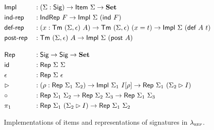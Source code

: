 \begin{figure}[H]
  \begin{alignat*}{2}
  & \Impl &&: (\Sigma : \Sig) \to \Item\ \Sigma \to \Set \\
  & \mta{ind-rep} &&: \mta{IndRep}\ F \to \Impl\ \Sigma\ (\mta{ind}\ F) \\
  & \mta{def-rep} &&: (x : \Tm\ (\Sigma, \epsilon)\ A) \to \Tm\ (\Sigma, \epsilon)\ (x = t) \to \Impl\ \Sigma\ (\mta{def}\ A\ t) \\
  & \mta{post-rep} &&: \Tm\ (\Sigma, \epsilon)\ A \to \Impl\ \Sigma\ (\mta{post}\ A) \\[1em]
  & \Rep &&: \Sig \to \Sig \to \Set \\
  & \mta{id} &&: \Rep\ \Sigma\ \Sigma \\
  & \epsilon &&: \Rep\ \Sigma\ \epsilon \\
  & \rhd &&: (\rho : \Rep\ \Sigma_1\ \Sigma_2) \to \Impl\ \Sigma_1\ I[\rho] \to \Rep\ \Sigma_1\ (\Sigma_2\rhd I) \\
  & \circ &&: \Rep\ \Sigma_1\ \Sigma_2 \to \Rep\ \Sigma_2\ \Sigma_3 \to \Rep\ \Sigma_1\ \Sigma_3 \\
  & \pi_1 &&: \Rep\ \Sigma_1\ (\Sigma_2 \rhd I) \to \Rep\ \Sigma_1\ \Sigma_2
  \end{alignat*}
  \caption{Implementations of items and representations of signatures in $\lambda_{\textsc{rep}}$.}
  \label{fig:lambdaind-impls-reprs}
\end{figure}


